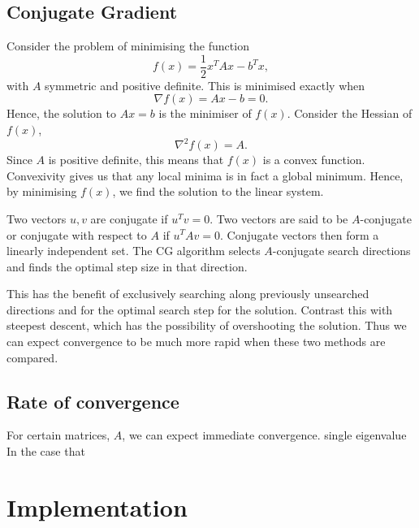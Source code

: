 \subsection{Conjugate Gradient}
\label{sec:cg}




Consider the problem of minimising the function
\[
    f(x) = \frac{1}{2} x^T A x - b^T x,
\]
with $A$ symmetric and positive definite. This is minimised exactly when 
\[
    \nabla f(x) = A x - b = 0.
\]
Hence, the solution to $Ax=b$ is the minimiser of $f(x)$.
Consider the Hessian of $f(x)$,
\[
    \nabla^2 f(x) = A.
\]
Since $A$ is positive definite, this means that $f(x)$ is a convex function.
Convexivity gives us that any local minima is in fact a global minimum.
Hence, by minimising $f(x)$, we find the solution to the linear system.

Two vectors $u, v$ are conjugate if $u^T v = 0$. 
Two vectors are said to be $A$-conjugate or conjugate with respect to $A$ if $u^T A v = 0$.
Conjugate vectors then form a linearly independent set.
The CG algorithm selects $A$-conjugate search directions and finds the optimal step size in that direction.

This has the benefit of exclusively searching along previously unsearched directions and for the optimal search step for the solution.
Contrast this with steepest descent, which has the possibility of overshooting the solution.
Thus we can expect convergence to be much more rapid when these two methods are compared.


\subsection{Rate of convergence}

For certain matrices, $A$, we can expect immediate convergence. single eigenvalue
In the case that 


\section{Implementation}

\iffalse
Implementation discussion:

+Better band storage for wide bands with lots of zeros. Store the nonzeros with their locations.
-Better interaction with the program for inputting data or getting results. Use of a scripting language and parser. 
+Should treat vectors as matrices, reduces number of classes, fewer bugs and easier implementation.
+Sparse matrices
Unit tests
Error handling
\fi


